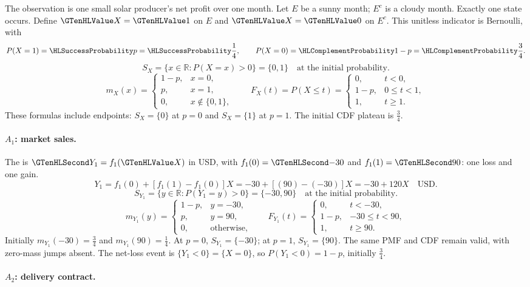 The observation is one small solar producer's net profit over one month. Let $E$ be a sunny month; $E^c$ is a cloudy month. Exactly one state occurs. Define $\Indicator{X}=\Indicator{1}$ on $E$ and $\Indicator{X}=\Indicator{0}$ on $E^c$. This unitless indicator is Bernoulli, with
\[P(X=1)=\SuccessProb{p}=\SuccessProb{\frac{1}{4}},\qquad P(X=0)=\FailureProb{1-p}=\FailureProb{\frac{3}{4}}.\]
\[S_X=\{x\in\mathbb R:P(X=x)>0\}=\{0,1\}\quad\text{at the initial probability}.\]
\[m_X(x)=\begin{cases}1-p,&x=0,\\p,&x=1,\\0,&x\notin\{0,1\},\end{cases}\qquad F_X(t)=P(X\leq t)=\begin{cases}0,&t<0,\\1-p,&0\leq t<1,\\1,&t\geq1.\end{cases}\]
These formulas include endpoints: $S_X=\{0\}$ at $p=0$ and $S_X=\{1\}$ at $p=1$. The initial CDF plateau is $\frac{3}{4}$.
\paragraph{$A_1$: market sales.}
The  is $\Money{Y_1}=f_1(\Indicator{X})$ in USD,
with $f_1(0)=\Money{-30}$ and $f_1(1)=\Money{90}$: one loss and one gain.
\[
Y_1=f_1(0)+[f_1(1)-f_1(0)]X=-30+[(90)-(-30)]X=-30+120X\quad\text{USD}.
\]
\[S_{Y_1}=\{y\in\mathbb R:P(Y_1=y)>0\}=\{-30,90\}\quad\text{at the initial probability}.\]
\[
m_{Y_1}(y)=\begin{cases}1-p,&y=-30,\\p,&y=90,\\0,&\text{otherwise},\end{cases}
\qquad F_{Y_1}(t)=\begin{cases}0,&t<-30,\\1-p,&-30\leq t<90,\\1,&t\geq 90.\end{cases}
\]
Initially $m_{Y_1}(-30)=\frac{3}{4}$ and $m_{Y_1}(90)=\frac{1}{4}$.
At $p=0$, $S_{Y_1}=\{-30\}$; at $p=1$, $S_{Y_1}=\{90\}$.
The same PMF and CDF remain valid, with zero-mass jumps absent.
The net-loss event is $\{Y_1<0\}=\{X=0\}$, so $P(Y_1<0)=1-p$,
initially $\frac{3}{4}$.
\paragraph{$A_2$: delivery contract.}
